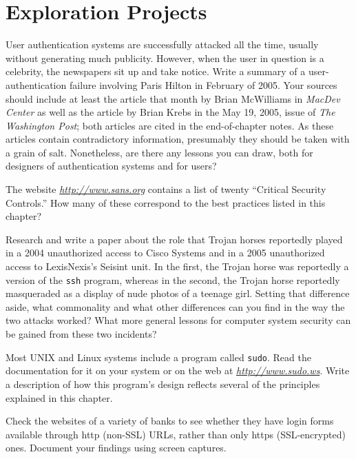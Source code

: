 \section*{Exploration Projects}
\begin{chapterEnumerate}

\item\label{paris-hilton-project}
User authentication systems are successfully attacked all the time,
usually without generating much publicity.  However, when the user in
question is a celebrity, the newspapers sit up and take notice.  Write
a summary of a user-authentication failure involving Paris Hilton in
February of 2005.  Your sources should include at least the article that
month by Brian McWilliams in \textit{MacDev Center} as well as the
article by Brian Krebs in the May 19, 2005, issue
of \textit{The Washington Post}; both articles are cited in the
end-of-chapter notes.  As these articles contain contradictory
information, presumably they should be taken with a grain of salt.
Nonetheless, are there any lessons you can draw, both for designers of authentication systems and
for users?

\item
The website \textit{\url{http://www.sans.org}} contains a list of twenty
``Critical Security Controls.''
How many of these correspond to
the best practices listed in this chapter?

\item
Research and write a paper about the role that Trojan horses
reportedly played in a 2004 unauthorized access to Cisco Systems and
in a 2005 unauthorized access to LexisNexis's Seisint unit.  In the
first, the Trojan horse was reportedly a version of the {\tt ssh}
program, whereas in the second, the Trojan horse reportedly
masqueraded as a display of nude photos of a teenage girl.  Setting
that difference aside, what commonality and what other differences can
you find in the way the two attacks worked?  What more general lessons
for computer system security can be gained from these two incidents?

\item
Most UNIX and Linux systems include a program called {\tt sudo}.  Read
the documentation for it on your system or on the web at
\textit{\url{http://www.sudo.ws}}.  Write a description of how this
program's design reflects several of the principles explained
in this chapter.

\item
Check the websites of a variety of banks to see whether they have login forms available through http (non-SSL) URLs, rather than only https (SSL-encrypted) ones.  Document your findings using screen captures.


\end{chapterEnumerate}
